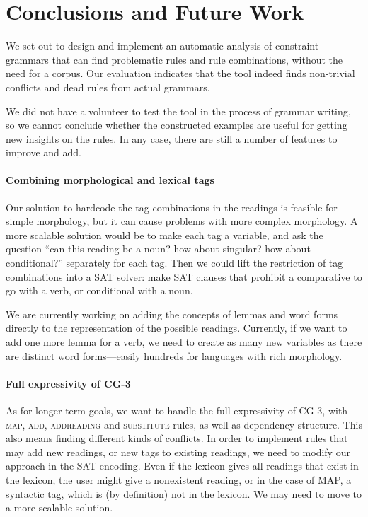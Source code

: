 \section{Conclusions and Future Work}
\label{sec:conclusion}

We set out to design and implement an automatic analysis of constraint grammars that can find problematic rules and rule combinations, without the need for a corpus.
Our evaluation indicates that the tool indeed finds non-trivial conflicts and dead rules
from actual grammars. 

We did not have a volunteer to test the tool in
the process of grammar writing, so we cannot conclude whether the
constructed examples are useful for getting new insights on the rules.
In any case, there are still a number of features to improve and add.

\paragraph{Combining morphological and lexical tags}

Our solution to hardcode the tag combinations in the readings is
feasible for simple morphology, but it can cause problems with more
complex morphology.
A more scalable solution would be to make each tag a variable, and ask the
question ``can this reading be a noun? how about singular? how about
conditional?'' separately for each tag. Then we could lift the
restriction of tag combinations into a SAT solver: make SAT clauses
that prohibit a comparative to go with a verb, or conditional with a noun.

We are currently working on adding the concepts of lemmas and word
forms directly to the representation of the possible readings.
Currently, if we want to add one more lemma for a verb, we need to
create as many new variables as there are distinct word forms---easily
hundreds for languages with rich morphology. 


\paragraph{Full expressivity of CG-3}
As for longer-term goals, we want to handle the full expressivity of CG-3,
with \textsc{map}, \textsc{add},  \textsc{addreading} and
\textsc{substitute} rules, as well as dependency structure. 
This also means finding different kinds of conflicts.
In order to implement rules that may add new readings, or new tags to
existing readings, we need to modify our approach in the SAT-encoding.
Even if the lexicon gives all readings that exist in the lexicon, the
user might give a nonexistent reading, or in the case of MAP, a
syntactic tag, which is (by definition) not in the lexicon. We may need to move
to a more scalable solution.


